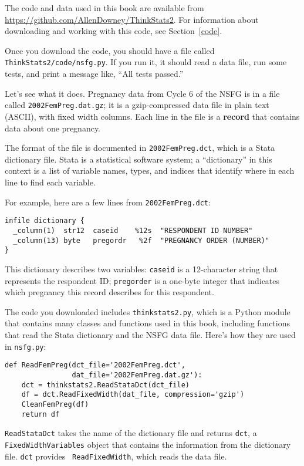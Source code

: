 \documentclass[12pt]{book}
\begin{document}
The code and data used in this book are available from
\url{https://github.com/AllenDowney/ThinkStats2}.  For information
about downloading and working with this code, see Section~\ref{code}.

Once you download the code, you should have a file called {\tt
  ThinkStats2/code/nsfg.py}.  If you run it, it should read a data
file, run some tests, and print a message like, ``All tests passed.''

Let's see what it does.  Pregnancy data from Cycle 6 of the NSFG is in
a file called {\tt 2002FemPreg.dat.gz}; it
is a gzip-compressed data file in plain text (ASCII), with fixed width
columns.  Each line in the file is a {\bf record} that
contains data about one pregnancy.

The format of the file is documented in {\tt 2002FemPreg.dct}, which
is a Stata dictionary file.  Stata is a statistical software system;
a ``dictionary'' in this context is a list of variable names, types,
and indices that identify where in each line to find each variable.

For example, here are a few lines from {\tt 2002FemPreg.dct}:
%
\begin{verbatim}
infile dictionary {
  _column(1)  str12  caseid    %12s  "RESPONDENT ID NUMBER"
  _column(13) byte   pregordr   %2f  "PREGNANCY ORDER (NUMBER)"
}
\end{verbatim}

This dictionary describes two variables: {\tt caseid} is a 12-character
string that represents the respondent ID; {\tt pregorder} is a 
one-byte integer that indicates which pregnancy this record
describes for this respondent.

The code you downloaded includes {\tt thinkstats2.py}, which is a Python
module
that contains many classes and functions used in this book,
including functions that read the Stata dictionary and
the NSFG data file.  Here's how they are used in {\tt nsfg.py}:

\begin{verbatim}
def ReadFemPreg(dct_file='2002FemPreg.dct',
                dat_file='2002FemPreg.dat.gz'):
    dct = thinkstats2.ReadStataDct(dct_file)
    df = dct.ReadFixedWidth(dat_file, compression='gzip')
    CleanFemPreg(df)
    return df
\end{verbatim}

{\tt ReadStataDct} takes the name of the dictionary file
and returns {\tt dct}, a {\tt FixedWidthVariables} object that contains the
information from the dictionary file.  {\tt dct} provides {\tt
  ReadFixedWidth}, which reads the data file.
\end{document}
